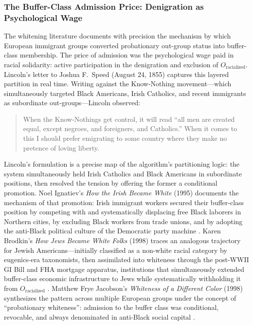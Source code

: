 \subsubsection*{The Buffer-Class Admission Price: Denigration as Psychological Wage}

The whitening literature documents with precision the mechanism by which European immigrant groups converted probationary out-group status into buffer-class membership. The price of admission was the psychological wage paid in racial solidarity: active participation in the denigration and exclusion of $O_{\text{racialized}}$. Lincoln's letter to Joshua F.\ Speed (August 24, 1855) captures this layered partition in real time. Writing against the Know-Nothing movement---which simultaneously targeted Black Americans, Irish Catholics, and recent immigrants as subordinate out-groups---Lincoln observed:

\begin{quote}
When the Know-Nothings get control, it will read ``all men are created equal, except negroes, and foreigners, and Catholics.'' When it comes to this I should prefer emigrating to some country where they make no pretence of loving liberty. \cite{lincoln_speed_1855}
\end{quote}

Lincoln's formulation is a precise map of the algorithm's partitioning logic: the system simultaneously held Irish Catholics and Black Americans in subordinate positions, then resolved the tension by offering the former a conditional promotion. Noel Ignatiev's \textit{How the Irish Became White} (1995) documents the mechanism of that promotion: Irish immigrant workers secured their buffer-class position by competing with and systematically displacing free Black laborers in Northern cities, by excluding Black workers from trade unions, and by adopting the anti-Black political culture of the Democratic party machine \cite{ignatiev}. Karen Brodkin's \textit{How Jews Became White Folks} (1998) traces an analogous trajectory for Jewish Americans---initially classified as a non-white racial category by eugenics-era taxonomists, then assimilated into whiteness through the post-WWII GI Bill and FHA mortgage apparatus, institutions that simultaneously extended buffer-class economic infrastructure to Jews while systematically withholding it from $O_{\text{racialized}}$ \cite{brodkin}. Matthew Frye Jacobson's \textit{Whiteness of a Different Color} (1998) synthesizes the pattern across multiple European groups under the concept of ``probationary whiteness'': admission to the buffer class was conditional, revocable, and always denominated in anti-Black social capital \cite{jacobson_whiteness}.

